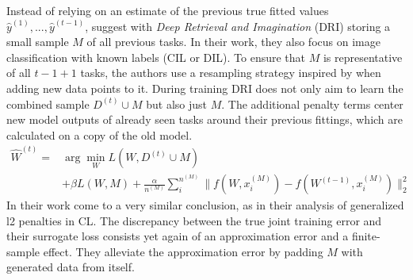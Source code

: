 Instead of relying on an estimate of the previous true fitted values $\hat{y}^{(1)}, ..., \hat{y}^{(t-1)}$, \citeauthor{Wang_Liu_Duan_Tao_2022} \cite{Wang_Liu_Duan_Tao_2022} suggest with \textit{Deep Retrieval and Imagination} (DRI) storing a small sample $M$ of all previous tasks. In their work, they also focus on image classification with known labels (CIL or DIL). To ensure that $M$ is representative of all $t-1 + 1$ tasks, the authors use a resampling strategy inspired by \citeauthor{welling_2009} \cite{welling_2009} when adding new data points to it. During training DRI does not only aim to learn the combined sample $D^{(t)} \cup M$ but also just $M$. The additional penalty terms center new model outputs of already seen tasks around their previous fittings, which are calculated on a copy of the old model.
\begin{equation}\label{dri}
	\begin{split}
		\hat{W}^{(t)} = &\arg\min_{W} L(W, D^{(t)} \cup M)\\
		&+ \beta L(W, M) + \frac{\alpha}{n^{(M)}}\sum_{i}^{n^{(M)}}\lVert f(W, x_i^{(M)}) - f(W^{(t-1)}, x_i^{(M)}) \rVert_2^2
	\end{split}
\end{equation}
In their work \citeauthor{Wang_Liu_Duan_Tao_2022} come to a very similar conclusion, as \citeauthor{yin2021optimizationgeneralizationregularizationbasedcontinual} \cite{yin2021optimizationgeneralizationregularizationbasedcontinual} in their analysis of generalized l2 penalties in CL. The discrepancy between the true joint training error and their surrogate loss consists yet again of an approximation error and a finite-sample effect. They alleviate the approximation error by padding $M$ with generated data from itself.

